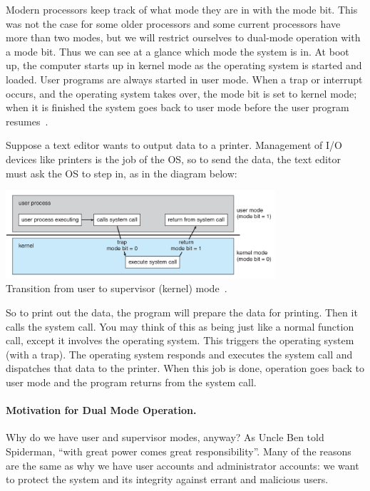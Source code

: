 Modern processors keep track of what mode they are in with the mode bit. This was not the case for some older processors and some current processors have more than two modes, but we will restrict ourselves to dual-mode operation with a mode bit. Thus we can see at a glance which mode the system is in. At boot up, the computer starts up in kernel mode as the operating system is started and loaded. User programs are always started in user mode. When a trap or interrupt occurs, and the operating system takes over, the mode bit is set to kernel mode; when it is finished the system goes back to user mode before the user program resumes~\cite{osc}.

Suppose a text editor wants to output data to a printer. Management of I/O devices like printers is the job of the OS, so to send the data, the text editor must ask the OS to step in, as in the diagram below:

\begin{center}
	\includegraphics[width=0.75\textwidth]{images/trap.png}\\
	Transition from user to supervisor (kernel) mode~\cite{osc}.
\end{center}


So to print out the data, the program will prepare the data for printing. Then it calls the system call. You may think of this as being just like a normal function call, except it involves the operating system. This triggers the operating system (with a trap). The operating system responds and executes the system call and dispatches that data to the printer. When this job is done, operation goes back to user mode and the program returns from the system call.

\paragraph{Motivation for Dual Mode Operation.}

Why do we have user and supervisor modes, anyway? As Uncle Ben told Spiderman, ``with great power comes great responsibility''. Many of the reasons are the same as why we have user accounts and administrator accounts: we want to protect the system and its integrity against errant and malicious users.

